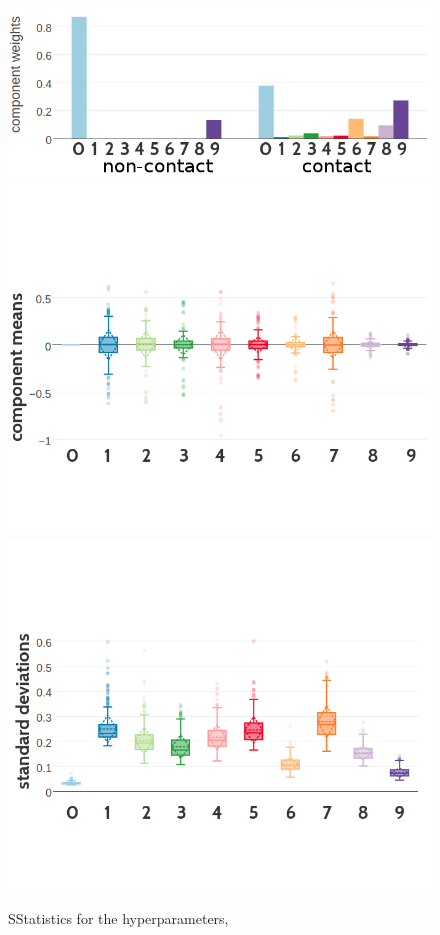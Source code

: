 \documentclass[11pt,a4paper,twoside]{book}
\theoremstyle{definition}
\theoremstyle{definition}
\theoremstyle{remark}
\begin{document}
\begin{figure}
\includegraphics[width=0.9\linewidth]{img/bayesian_model/pll/10/300k_weights_noncontacththr25} \includegraphics[width=0.9\linewidth]{img/bayesian_model/pll/10/300k_mus_noncontactthr25} \includegraphics[width=0.9\linewidth]{img/bayesian_model/pll/10/300k_std_noncontactthr25} \caption{SStatistics for the hyperparameters,
}
\end{figure}
\end{document}
